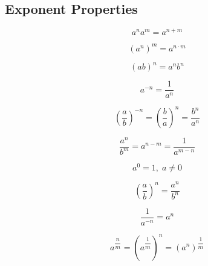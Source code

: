 \documentclass[12pt, a5paper]{article}
\begin{document}
\subsection*{Exponent Properties}
$$
a^n a^m = a^{n + m}
$$

$$
(a^n)^m = a^{n\cdot m}
$$

$$
(ab)^n = a^n b^n
$$

$$
a^{-n} = \dfrac{1}{a^n}
$$

$$
\left(\dfrac{a}{b}\right)^{-n} = \left(\dfrac{b}{a}\right)^n = \dfrac{b^n}{a^n}
$$

$$
\dfrac{a^n}{b^m} = a^{n - m} = \dfrac{1}{a^{m - n}}
$$

$$
a^0 = 1,\;a \ne 0
$$

$$
\left(\dfrac{a}{b}\right)^{n} = \dfrac{a^n}{b^n}
$$

$$
\dfrac{1}{a^{-n}} = a^n
$$

$$
a^{\dfrac{n}{m}} = \left(a^{\dfrac{1}{m}}\right)^n = \left(a^n\right)^{\dfrac1{m}}
$$
\end{document}
